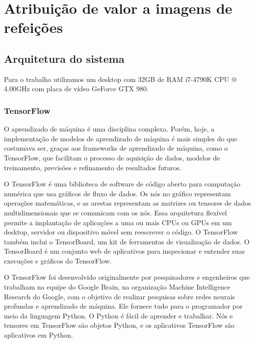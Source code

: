 \section{Atribuição de valor a imagens de refeições}

\subsection{Arquitetura do sistema}

Para o trabalho utilizamos um desktop com 32GB de RAM i7-4790K CPU @ 4.00GHz com placa de vídeo GeForce GTX 980.

\subsubsection{TensorFlow}

O aprendizado de máquina é uma disciplina complexa. Porém, hoje, a implementação de modelos de aprendizado de máquina é mais simples do que costumava ser, graças aos frameworks de aprendizado de máquina, como o TensorFlow, que facilitam o processo de aquisição de dados, modelos de treinamento, previsões e refinamento de resultados futuros.



O TensorFlow é uma biblioteca de software de código aberto para computação numérica que usa gráficos de fluxo de dados. Os nós no gráfico representam operações matemáticas, e as arestas representam as matrizes ou tensores de dados multidimensionais que se comunicam com os nós. Essa arquitetura flexível permite a implantação de aplicações a uma ou mais CPUs ou GPUs em um desktop, servidor ou dispositivo móvel sem reescrever o código. O TensorFlow também inclui o TensorBoard, um kit de ferramentas de visualização de dados. O TensorBoard é um conjunto web de aplicativos para inspecionar e entender suas execuções e gráficos do TensorFlow.

O TensorFlow foi desenvolvido originalmente por pesquisadores e engenheiros que trabalham na equipe do Google Brain, na organização Machine Intelligence Research do Google, com o objetivo de realizar pesquisas sobre redes neurais profundas e aprendizado de máquina. Ele fornece tudo para o programador por meio da linguagem Python. O Python é fácil de aprender e trabalhar. Nós e tensores em TensorFlow são objetos Python, e os aplicativos TensorFlow são aplicativos em Python.

